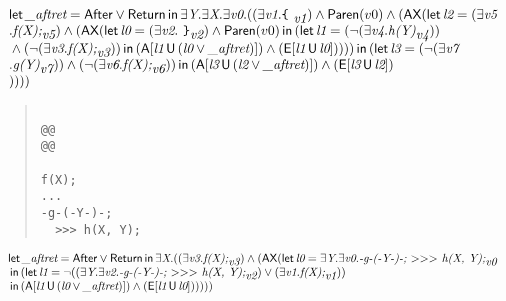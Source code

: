 \documentclass{article}
\newcommand{\U}{\,\mbox{\sf{U}}\,}
\newcommand{\A}{\mbox{\sf{A}}}
\newcommand{\E}{\mbox{\sf{E}}}
\newcommand{\AX}{\mbox{\sf{AX}}}
\newcommand{\mita}[1]{\mbox{\it{{#1}}}}
\newcommand{\msf}[1]{\mbox{\sf{{#1}}}}
\newcommand{\mth}[1]{\({#1}\)}
\newcommand{\ttlb}{\mbox{\tt \char'173}}
\newcommand{\ttrb}{\mbox{\tt \char'175}}
\begin{document}
\[\begin{array}{l}
\mita{\sf{let}} \, \mita{\_aftret} = \msf{After} \vee \msf{Return} \, \mita{\sf{in}} \, \exists \mita{Y} . \exists \mita{X} . \exists \mita{v0} . ((\exists \mita{v1} . \mita{{\ttlb}
  }_{\mita{v1}}) \wedge \msf{Paren}(v0) \wedge (\AX(\mita{\sf{let}} \, \mita{l2} = (\exists \mita{v5}\\\mbox{} . \mita{f(X);}_{\mita{v5}}) \wedge (\AX(\mita{\sf{let}} \, \mita{l0} = (\exists \mita{v2} . \mita{
{\ttrb}}_{\mita{v2}}) \wedge \msf{Paren}(v0) \, \mita{\sf{in}} \, (\mita{\sf{let}} \, \mita{l1} = (\neg (\exists \mita{v4} . \mita{h(Y)}_{\mita{v4}}))\\\mbox{} \wedge (\neg (\exists \mita{v3} . \mita{f(X);}_{\mita{v3}})) \, \mita{\sf{in}} \, (\A[\mita{l1} \U (\mita{l0} \vee \mita{\_aftret})]
) \wedge (\E[\mita{l1} \U \mita{l0}]
)
)
)) \, \mita{\sf{in}} \, (\mita{\sf{let}} \, \mita{l3} = (\neg (\exists \mita{v7}\\\mbox{} . \mita{g(Y)}_{\mita{v7}})) \wedge (\neg (\exists \mita{v6} . \mita{f(X);}_{\mita{v6}})) \, \mita{\sf{in}} \, (\A[\mita{l3} \U (\mita{l2} \vee \mita{\_aftret})]
) \wedge (\E[\mita{l3} \U \mita{l2}]
)\\\mbox{}
)
)))

\end{array}\]

\begin{quote}\begin{verbatim}

@@
@@

f(X);
...
-g-(-Y-)-;
  >>> h(X, Y);

\end{verbatim}\end{quote}

\[\begin{array}{l}
\mita{\sf{let}} \, \mita{\_aftret} = \msf{After} \vee \msf{Return} \, \mita{\sf{in}} \, \exists \mita{X} . ((\exists \mita{v3} . \mita{f(X);}_{\mita{v3}}) \wedge (\AX(\mita{\sf{let}} \, \mita{l0} = \exists \mita{Y} . \exists \mita{v0} . \mita{-g-(-Y-)-;
  \mth{>}\mth{>}\mth{>} h(X, Y);}_{\mita{v0}}\\\mbox{} \, \mita{\sf{in}} \, (\mita{\sf{let}} \, \mita{l1} = \neg ((\exists \mita{Y} . \exists \mita{v2} . \mita{-g-(-Y-)-;
  \mth{>}\mth{>}\mth{>} h(X, Y);}_{\mita{v2}}) \vee (\exists \mita{v1} . \mita{f(X);}_{\mita{v1}}))\\\mbox{} \, \mita{\sf{in}} \, (\A[\mita{l1} \U (\mita{l0} \vee \mita{\_aftret})]
) \wedge (\E[\mita{l1} \U \mita{l0}]
)
)
)))

\end{array}\]
\end{document}
